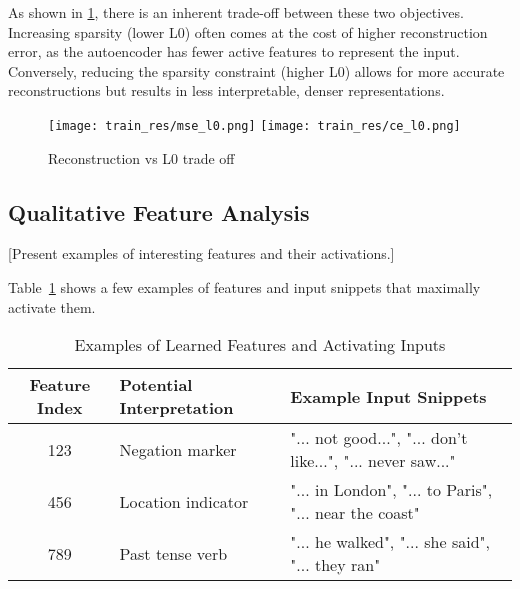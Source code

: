 \documentclass{article}
\begin{document}
As shown in \cref{fig:training_loss}, there is an inherent trade-off between these two objectives. Increasing sparsity (lower L0) often comes at the cost of higher reconstruction error, as the autoencoder has fewer active features to represent the input. Conversely, reducing the sparsity constraint (higher L0) allows for more accurate reconstructions but results in less interpretable, denser representations.

\begin{figure}[!htbp]
    \centering
    \texttt{[image: train\_res/mse\_l0.png]}
    \texttt{[image: train\_res/ce\_l0.png]}
    \caption{Reconstruction vs L0 trade off}
    \label{fig:training_loss}
\end{figure}


\subsection{Qualitative Feature Analysis}
[Present examples of interesting features and their activations.]

Table~\ref{tab:feature_examples} shows a few examples of features and input snippets that maximally activate them.

\begin{table}[!htbp]
    \centering
    \caption{Examples of Learned Features and Activating Inputs}
    \label{tab:feature_examples}
    \begin{tabular}{cll}
        \toprule
        Feature Index & Potential Interpretation & Example Input Snippets \\
        \midrule
        123           & Negation marker          & "... not good...", "... don't like...", "... never saw..." \\
        456           & Location indicator       & "... in London", "... to Paris", "... near the coast" \\
        789           & Past tense verb          & "... he walked", "... she said", "... they ran" \\
        \bottomrule
    \end{tabular}
\end{table}
\end{document}
